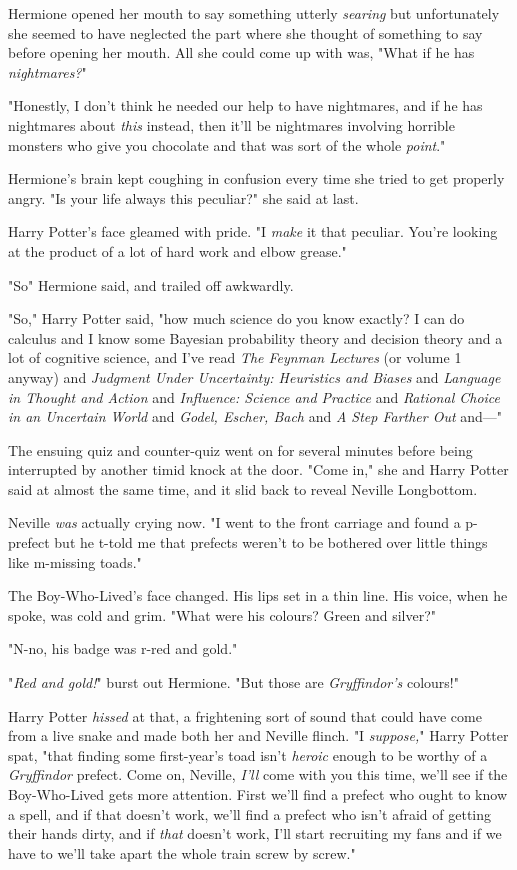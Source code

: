 Hermione opened her mouth to say something utterly \emph{searing} but
unfortunately she seemed to have neglected the part where she thought of
something to say before opening her mouth. All she could come up with was,
"What if he has \emph{nightmares?}"

"Honestly, I don't think he needed our help to have nightmares, and if he has
nightmares about \emph{this} instead, then it'll be nightmares involving
horrible monsters who give you chocolate and that was sort of the whole
\emph{point}."

Hermione's brain kept coughing in confusion every time she tried to get
properly angry. "Is your life always this peculiar?" she said at last.

Harry Potter's face gleamed with pride. "I \emph{make} it that peculiar. You're
looking at the product of a lot of hard work and elbow grease."

"So{\el}" Hermione said, and trailed off awkwardly.

"So," Harry Potter said, "how much science do you know exactly? I can do
calculus and I know some Bayesian probability theory and decision theory and a
lot of cognitive science, and I've read \emph{The Feynman Lectures} (or volume
1 anyway) and \emph{Judgment Under Uncertainty: Heuristics and Biases} and
\emph{Language in Thought and Action} and \emph{Influence: Science and
Practice} and \emph{Rational Choice in an Uncertain World} and \emph{Godel,
Escher, Bach} and \emph{A Step Farther Out} and—"

The ensuing quiz and counter-quiz went on for several minutes before being
interrupted by another timid knock at the door. "Come in," she and Harry Potter
said at almost the same time, and it slid back to reveal Neville Longbottom.

Neville \emph{was} actually crying now. "I went to the front carriage and found
a p-prefect but he t-told me that prefects weren't to be bothered over little
things like m-missing toads."

The Boy-Who-Lived's face changed. His lips set in a thin line. His voice, when
he spoke, was cold and grim. "What were his colours? Green and silver?"

"N-no, his badge was r-red and gold."

"\emph{Red and gold!}" burst out Hermione. "But those are \emph{Gryffindor's}
colours!"

Harry Potter \emph{hissed} at that, a frightening sort of sound that could have
come from a live snake and made both her and Neville flinch. "I
\emph{suppose,}" Harry Potter spat, "that finding some first-year's toad isn't
\emph{heroic} enough to be worthy of a \emph{Gryffindor} prefect. Come on,
Neville, \emph{I'll} come with you this time, we'll see if the Boy-Who-Lived
gets more attention. First we'll find a prefect who ought to know a spell, and
if that doesn't work, we'll find a prefect who isn't afraid of getting their
hands dirty, and if \emph{that} doesn't work, I'll start recruiting my fans and
if we have to we'll take apart the whole train screw by screw."

